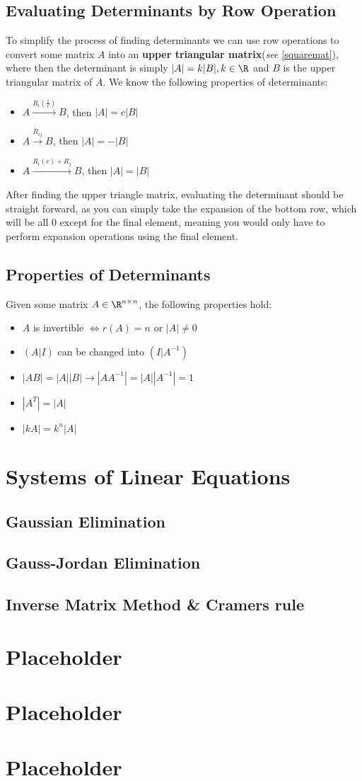 \documentclass[a4paper]{article}
\begin{document}
  \subsection{Evaluating Determinants by Row Operation}
  To simplify the process of finding determinants we can use row operations to convert some matrix $A$ into an \textbf{upper triangular matrix}(\textit{see} \ref{squaremat}), where then the determinant is simply $|A| = k|B|, k\in \R$ and $B$ is the upper triangular matrix of $A$.
  We know the following properties of determinants:
  \begin{itemize}
    \item $A \overset{\displaystyle{R_i (\frac{1 }{c})}}{\longrightarrow} B$, then $|A| = c|B|$
    \item $A \overset{\displaystyle{R_{ij}}}{\longrightarrow} B$, then $|A| = -|B|$
    \item $A \overset{\displaystyle{R_i(c)+R_j }}{\longrightarrow} B$, then $|A| = |B|$
  \end{itemize}
  After finding the upper triangle matrix, evaluating the determinant should be straight forward, as you can simply take the expansion of the bottom row, which will be all 0 except for the final element, meaning you would only have to perform expansion operations using the final element.
  \subsection{Properties of Determinants}
  Given some matrix $A \in \R^{n\times n}$, the following properties hold:
  \begin{itemize}
    \item $A$ is invertible $\Leftrightarrow r(A) = n$ or $|A| \neq 0$
    \item $(A|I)$ can be changed into $(I|A^{-1})$
    \item $|AB| = |A||B| \rightarrow |AA^{-1}| = |A||A^{-1}| = 1$
    \item $|A^T| = |A|$
    \item $|kA| = k^n|A|$
  \end{itemize}
  \section{Systems of Linear Equations} 
  \subsection{Gaussian Elimination}
  \subsection{Gauss-Jordan Elimination}
  \subsection{Inverse Matrix Method \& Cramer\textquotesingle s rule}
  \section{Placeholder} 
  \section{Placeholder} 
  \section{Placeholder} 
\end{document}

